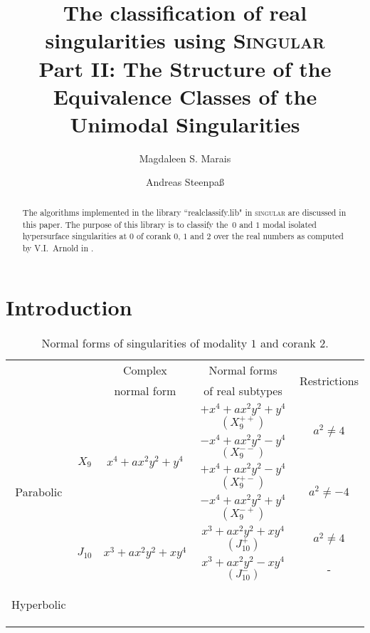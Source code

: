 \documentclass[noend]{amsproc}
\title[The classification of real singularities using \textsc{Singular}, %
Part II]%
{The classification of real singularities using \textsc{Singular}\\
Part II: The Structure of the Equivalence Classes of the Unimodal %
Singularities}
\author{Magdaleen S. Marais}
\author{Andreas Steenpa\ss}
\theoremstyle{definition}
\begin{document}
\begin{abstract}
The algorithms implemented in the library ``realclassify.lib" in
\textsc{singular} are discussed in this paper. The purpose of this library is
to classify the~$0$ and $1$ modal isolated hypersurface singularities at $0$ of
corank $0$, $1$ and $2$ over the real numbers as computed by V.I.~Arnold in
\cite{AVG1985}.
\end{abstract}
\maketitle


\section{Introduction}

\begin{table}[htbp]
\centering
\caption{Normal forms of singularities of modality $1$ and corank $2$.}
\label{tab:normal_forms}
\begin{tabular}{|c|c|c|c|c|}
\hline

\multicolumn{1}{|c}{}
 & & Complex     & Normal forms     & \multirow{2}{*}{Restrictions} \\
\multicolumn{1}{|c}{}
 & & normal form & of real subtypes &                               \\
\hline\hline


\multirow{6}{*}{\begin{sideways}Parabolic\end{sideways}}

& \multirow{4}{*}{$X_9$} & \multirow{4}{*}{$x^4+ax^2y^2+y^4$}
  & $+x^4+ax^2y^2+y^4$ $(X_9^{++})$ & \multirow{2}{*}{$a^2\neq4$} \\\cline{4-4}
&&& $-x^4+ax^2y^2-y^4$ $(X_9^{--})$ &                             \\\cline{4-5}
&&& $+x^4+ax^2y^2-y^4$ $(X_9^{+-})$ & \multirow{2}{*}{$a^2\neq-4$}\\\cline{4-4}
&&& $-x^4+ax^2y^2+y^4$ $(X_9^{-+})$ &                             \\\cline{2-5} 

& \multirow{2}{*}{$J_{10}$} & \multirow{2}{*}{$x^3+ax^2y^2+xy^4$}
  & $x^3+ax^2y^2+xy^4$ $(J_{10}^+)$ & $a^2 \neq 4$ \\ \cline{4-5}
&&& $x^3+ax^2y^2-xy^4$ $(J_{10}^-)$ & -            \\ \hline


\multirow{12}{*}{\begin{sideways}Hyperbolic\end{sideways}}


\end{tabular}
\end{table}
\end{document}
